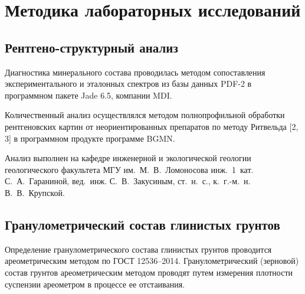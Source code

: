 \chapter{Методика лабораторных исследований}\label{ch:ch6}

\section{Рентгено-структурный анализ}


Диагностика минерального состава проводилась методом сопоставления экспериментального и эталонных 
спектров из базы данных PDF-2 в программном пакете Jade 6.5, компании MDI.

Количественный анализ осуществлялся методом полнопрофильной обработки рентгеновских 
картин от неориентированных препаратов по методу Ритвельда [2, 3] в программном продукте программе BGMN.

Анализ выполнен на кафедре инженерной и экологической геологии геологического факультета МГУ им.~М.~В.~Ломоносова
инж.~1~кат. С.~А.~Гараниной, вед.~инж. С.~В.~Закусиным, ст.~н.~с., к.~г.-м.~н. В.~В.~Крупской.

\section{Гранулометрический состав глинистых грунтов}

Определение гранулометрического состава глинистых грунтов проводится ареометрическим методом 
по ГОСТ 12536--2014. Гранулометрический (зерновой) состав грунтов
ареометрическим методом проводят путем измерения плотности суспензии
ареометром в процессе ее отстаивания. 

